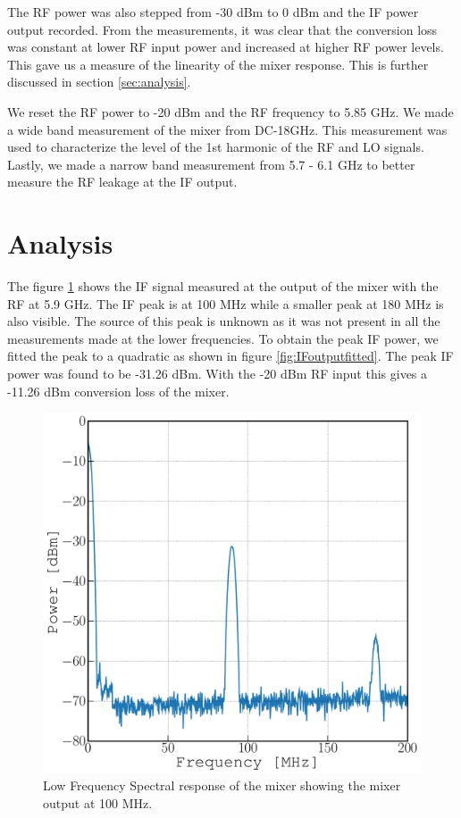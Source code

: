 \documentclass[twocolumn, aps, floatfix]{revtex4-1}
\begin{document}
The RF power was also stepped from -30 dBm to 0 dBm and the IF power output recorded. From the measurements, it was clear that the conversion loss was constant at lower RF input power and increased at higher RF power levels. This gave us a measure of the linearity of the mixer response. This is further discussed in section \ref{sec:analysis}.

We reset the RF power to -20 dBm and the RF frequency to 5.85 GHz. We made a wide band measurement of the mixer from DC-18GHz. This measurement was used to characterize the level of the 1st harmonic of the RF and LO signals. Lastly, we made a narrow band measurement from 5.7 - 6.1 GHz to better measure the RF leakage at the IF output.

\FloatBarrier
\section*{Analysis}\label{sec:analysis}

The figure \ref{fig:IFoutput} shows the IF signal measured at the output of the mixer with the RF at 5.9 GHz. The IF peak is at 100 MHz while a smaller peak at 180 MHz is also visible. The source of this peak is unknown as it was not present in all the measurements made at the lower frequencies. To obtain the peak IF power, we fitted the peak to a quadratic as shown in figure \ref{fig:IFoutputfitted}. The peak IF power was found to be -31.26 dBm. With the -20 dBm RF input this gives a -11.26 dBm conversion loss of the mixer.

\begin{figure}[!htbp]
    \includegraphics[scale=0.35]{DC_to_200MHz.pdf}
    \caption{Low Frequency Spectral response of the mixer showing the mixer output at 100 MHz.}
    \label{fig:IFoutput}
\end{figure}
\end{document}
